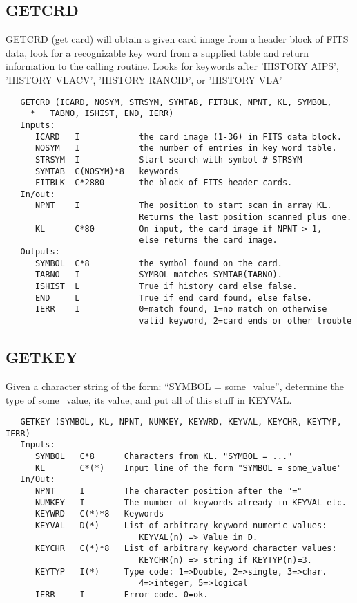 \subsection{GETCRD}
GETCRD (get card) will obtain a given card image from a header block
of FITS data, look for a recognizable key word from a supplied table
and return information to the calling routine.
Looks for keywords after 'HISTORY AIPS', 'HISTORY VLACV',
'HISTORY RANCID', or 'HISTORY VLA'
\begin{verbatim}
   GETCRD (ICARD, NOSYM, STRSYM, SYMTAB, FITBLK, NPNT, KL, SYMBOL,
     *   TABNO, ISHIST, END, IERR)
   Inputs:
      ICARD   I            the card image (1-36) in FITS data block.
      NOSYM   I            the number of entries in key word table.
      STRSYM  I            Start search with symbol # STRSYM
      SYMTAB  C(NOSYM)*8   keywords
      FITBLK  C*2880       the block of FITS header cards.
   In/out:
      NPNT    I            The position to start scan in array KL.
                           Returns the last position scanned plus one.
      KL      C*80         On input, the card image if NPNT > 1,
                           else returns the card image.
   Outputs:
      SYMBOL  C*8          the symbol found on the card.
      TABNO   I            SYMBOL matches SYMTAB(TABNO).
      ISHIST  L            True if history card else false.
      END     L            True if end card found, else false.
      IERR    I            0=match found, 1=no match on otherwise
                           valid keyword, 2=card ends or other trouble
\end{verbatim}

\subsection{GETKEY}
Given a character string of the form: ``SYMBOL = some\_value'',
determine the type of some\_value, its value, and put all of this
stuff in KEYVAL.
\begin{verbatim}
   GETKEY (SYMBOL, KL, NPNT, NUMKEY, KEYWRD, KEYVAL, KEYCHR, KEYTYP, IERR)
   Inputs:
      SYMBOL   C*8      Characters from KL. "SYMBOL = ..."
      KL       C*(*)    Input line of the form "SYMBOL = some_value"
   In/Out:
      NPNT     I        The character position after the "="
      NUMKEY   I        The number of keywords already in KEYVAL etc.
      KEYWRD   C(*)*8   Keywords
      KEYVAL   D(*)     List of arbitrary keyword numeric values:
                           KEYVAL(n) => Value in D.
      KEYCHR   C(*)*8   List of arbitrary keyword character values:
                           KEYCHR(n) => string if KEYTYP(n)=3.
      KEYTYP   I(*)     Type code: 1=>Double, 2=>single, 3=>char.
                           4=>integer, 5=>logical
      IERR     I        Error code. 0=ok.
\end{verbatim}

